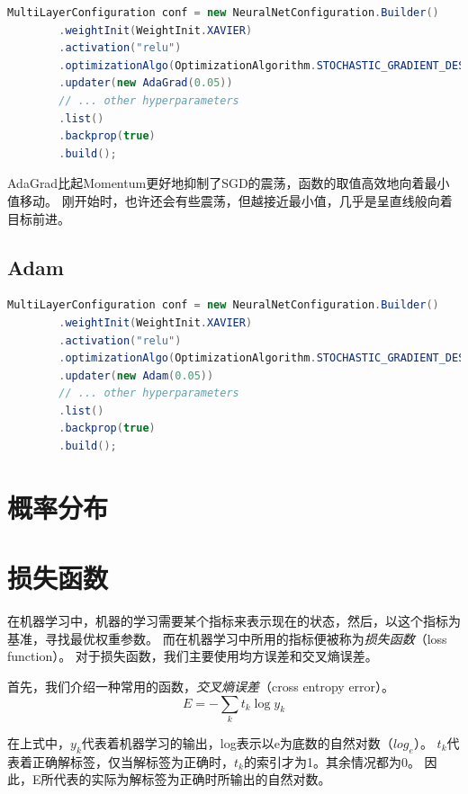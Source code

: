 \begin{lstlisting}[language=java]
	MultiLayerConfiguration conf = new NeuralNetConfiguration.Builder()
        .weightInit(WeightInit.XAVIER)
        .activation("relu")
        .optimizationAlgo(OptimizationAlgorithm.STOCHASTIC_GRADIENT_DESCENT)
        .updater(new AdaGrad(0.05))
        // ... other hyperparameters
        .list()
        .backprop(true)
        .build();
\end{lstlisting}
AdaGrad比起Momentum更好地抑制了SGD的震荡，函数的取值高效地向着最小值移动。
刚开始时，也许还会有些震荡，但越接近最小值，几乎是呈直线般向着目标前进。

\subsection{Adam}

\begin{lstlisting}[language=java]
	MultiLayerConfiguration conf = new NeuralNetConfiguration.Builder()
        .weightInit(WeightInit.XAVIER)
        .activation("relu")
        .optimizationAlgo(OptimizationAlgorithm.STOCHASTIC_GRADIENT_DESCENT)
        .updater(new Adam(0.05))
        // ... other hyperparameters
        .list()
        .backprop(true)
        .build();
\end{lstlisting}




\section{概率分布}

\section{损失函数}
在机器学习中，机器的学习需要某个指标来表示现在的状态，然后，以这个指标为基准，寻找最优权重参数。
而在机器学习中所用的指标便被称为\emph{损失函数}（loss function）。
对于损失函数，我们主要使用均方误差和交叉熵误差。

首先，我们介绍一种常用的函数，\emph{交叉熵误差}（cross entropy error）。
\begin{equation}
    E = - \sum _ { k } t _ { k } \log y _ { k }
    \label{part2_cross_entropy_error_1}
\end{equation}

在上式中，$y_{k}$代表着机器学习的输出，log表示以e为底数的自然对数（$log_{e}$）。
$t_{k}$代表着正确解标签，仅当解标签为正确时，$t_{k}$的索引才为1。其余情况都为0。
因此，E所代表的实际为解标签为正确时所输出的自然对数。

